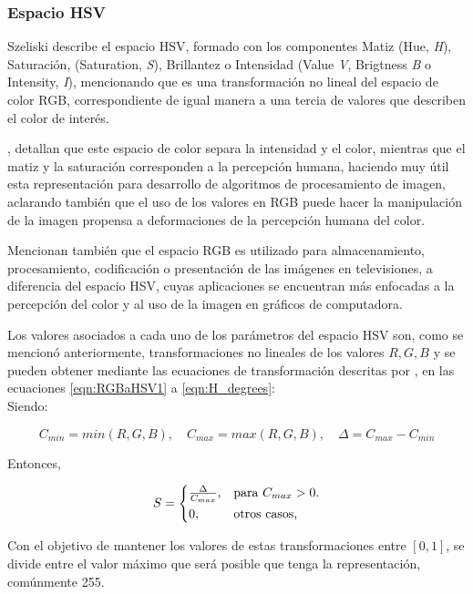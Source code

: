 \subsubsection{Espacio HSV}
Szeliski describe el espacio HSV, formado con los componentes Matiz (Hue, \textit{H}), Saturación, (Saturation, \textit{S}), Brillantez o Intensidad (Value \textit{V}, Brigtness \textit{B} o Intensity, \textit{I}), mencionando que es una transformación no lineal del espacio de color RGB, correspondiente de igual manera a una tercia de valores que describen el color de interés.

\cite{czerwinski_definitions_2013}, detallan que este espacio de color separa la intensidad y el color, mientras que el matiz y la saturación corresponden a la percepción humana, haciendo muy útil esta representación para desarrollo de algoritmos de procesamiento de imagen, aclarando también que el uso de los valores en RGB puede hacer la manipulación de la imagen propensa a deformaciones de la percepción humana del color. 

Mencionan también que el espacio RGB es utilizado para almacenamiento, procesamiento, codificación o presentación de las imágenes en televisiones, a diferencia del espacio HSV, cuyas aplicaciones se encuentran más enfocadas a la percepción del color y al uso de la imagen en gráficos de computadora.

Los valores asociados a cada uno de los parámetros del espacio HSV son, como se mencionó anteriormente, transformaciones no lineales de los valores  $R,G,B$ y se pueden obtener mediante las ecuaciones de transformación descritas por \cite{burger_digital_2022}, en las ecuaciones \ref{eqn:RGBaHSV1} a \ref{eqn:H_degrees}:\\

Siendo:

\begin{equation}
C_{min} = min(R,G,B), \quad
C_{max} = max(R,G,B), \quad
\Delta = C_{max} - C_{min}
\label{eqn:RGBaHSV1}
\end{equation}

\newpage
Entonces,

\begin{equation}
    S = \begin{cases*}
  \frac{\Delta}{C_{max}}, & para $C_{max} > 0$.\\
  0, & otros casos,
    \end{cases*}
    \label{eqn:Saturation}
\end{equation}

Con el objetivo de mantener los valores de estas transformaciones entre $[0,1]$, se divide entre el valor máximo que será posible que tenga la representación, comúnmente 255.

